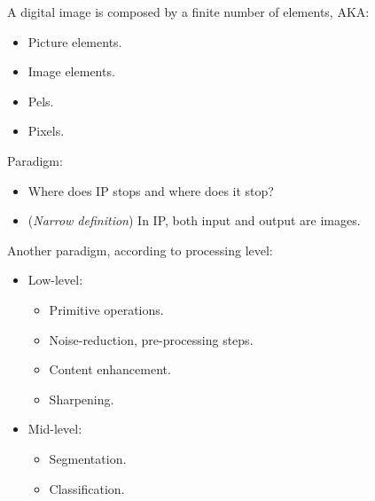 
\begin{frame}
A digital image is composed by a finite number of elements, AKA:
\begin{itemize}
\item Picture elements.
\item Image elements.
\item Pels.
\item Pixels.
\end{itemize}
Paradigm:
\begin{itemize}
\item Where does IP stops and where does it stop?
\item (\textit{Narrow definition}) In IP, both input and output are images.
\end{itemize}
\end{frame}


\begin{frame}
Another paradigm, according to processing level:
\begin{itemize}
\item Low-level:
\begin{itemize}
\item Primitive operations.
\item Noise-reduction, pre-processing steps.
\item Content enhancement.
\item Sharpening.
\end{itemize}
\item Mid-level:
\begin{itemize}
\item Segmentation.
\item Classification.
\end{itemize}
\end{itemize}
\end{frame}


